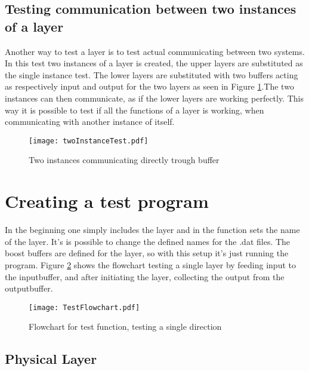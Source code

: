 \subsection{Testing communication between two instances of a layer}

Another way to test a layer is to test actual communicating between two systems. In this test two instances of a layer is created, the upper layers are substituted as the single instance test. The lower layers are substituted with two buffers acting as respectively  input and output for the two layers as seen in Figure \ref{fig:twoInstanceTest}.The two instances can then communicate, as if the lower layers are working perfectly. This way it is possible to test if all the functions of a layer is working, when communicating with another instance of itself.




\begin{figure}[htb]
	\begin{center}
	\texttt{[image: twoInstanceTest.pdf]}%
	\caption{Two instances communicating directly trough buffer}
	\label{fig:twoInstanceTest}	
	\end{center}
\end{figure}



\section{Creating a test program}
In the beginning one simply includes the layer and in the function sets the name of the layer. It's is possible to change the defined names for the .dat files. The boost buffers are defined for the layer, so with this setup it's just running the program.
Figure \ref{fig:TestFlowchart} shows the flowchart testing a single layer by feeding input to the inputbuffer, and after initiating the layer, collecting the output from the outputbuffer. 


\begin{figure}[htb]
	\begin{center}
	\texttt{[image: TestFlowchart.pdf]}
	\caption{Flowchart for test function, testing a single direction}
	\label{fig:TestFlowchart}	
	\end{center}
\end{figure}

\subsection{Physical Layer}

